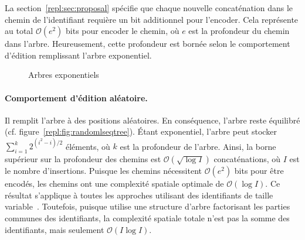 La section~\ref{repl:sec:proposal} spécifie que chaque nouvelle concaténation
dans le chemin de l'identifiant requière un bit additionnel pour l'encoder. Cela
représente au total $\mathcal{O}(e^2)$ bits pour encoder le chemin, où $e$ est
la profondeur du chemin dans l'arbre. Heureusement, cette profondeur est bornée
selon le comportement d'édition remplissant l'arbre exponentiel. 


\begin{figure}
  \begin{center}
    \hspace{10pt}
    \hspace{10pt}
    \caption{Arbres exponentiels}
  \end{center}
\end{figure}


\paragraph{Comportement d'édition aléatoire. } Il remplit l'arbre à des
positions aléatoires. En conséquence, l'arbre reste équilibré
(cf. figure~\ref{repl:fig:randomlseqtree}). Étant exponentiel, l'arbre peut
stocker $\textstyle\sum\nolimits_{i=1}^{k}{2^{(i^2-i)/2}}$ éléments, où $k$ est
la profondeur de l'arbre. Ainsi, la borne supérieur sur la profondeur des
chemins est $\mathcal{O}(\sqrt{\log I})$ concaténations, où $I$ est le nombre
d'insertions. Puisque les chemins nécessitent $\mathcal{O}(e^2)$ bits pour être
encodés, les chemins ont une complexité spatiale optimale de
$\mathcal{O}(\log I)$. Ce résultat s'applique à toutes les approches utilisant
des identifiants de taille variable~\cite{preguica2009commutative,
  weiss2009logoot}. Toutefois, puisque \LSEQ utilise une structure d'arbre
factorisant les parties communes des identifiants, la complexité spatiale totale
n'est pas la somme des identifiants, mais seulement $\mathcal{O}(I\log I)$.

